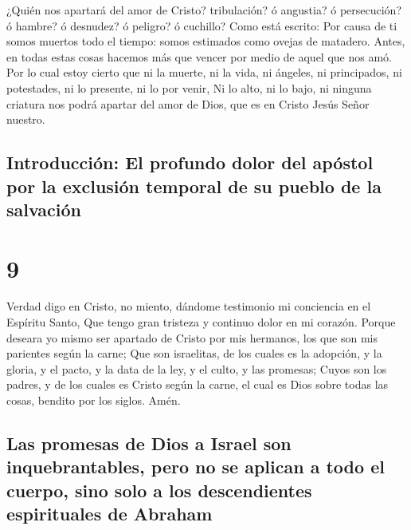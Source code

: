  ¿Quién nos apartará del amor de Cristo? tribulación? ó
angustia? ó persecución? ó hambre? ó desnudez? ó peligro? ó cuchillo?
 Como está escrito: Por causa de ti somos muertos todo el
tiempo: somos estimados como ovejas de matadero.  Antes,
en todas estas cosas hacemos más que vencer por medio de aquel que nos
amó.  Por lo cual estoy cierto que ni la muerte, ni la
vida, ni ángeles, ni principados, ni potestades, ni lo presente, ni lo
por venir,  Ni lo alto, ni lo bajo, ni ninguna criatura
nos podrá apartar del amor de Dios, que es en Cristo Jesús Señor
nuestro.

\hypertarget{introducciuxf3n-el-profundo-dolor-del-apuxf3stol-por-la-exclusiuxf3n-temporal-de-su-pueblo-de-la-salvaciuxf3n}{%
\subsection{Introducción: El profundo dolor del apóstol por la exclusión
temporal de su pueblo de la
salvación}\label{introducciuxf3n-el-profundo-dolor-del-apuxf3stol-por-la-exclusiuxf3n-temporal-de-su-pueblo-de-la-salvaciuxf3n}}

\hypertarget{section-45-9}{%
\section{9}\label{section-45-9}}

 Verdad digo en Cristo, no miento, dándome testimonio mi
conciencia en el Espíritu Santo,  Que tengo gran tristeza
y continuo dolor en mi corazón.  Porque deseara yo mismo
ser apartado de Cristo por mis hermanos, los que son mis parientes según
la carne;  Que son israelitas, de los cuales es la
adopción, y la gloria, y el pacto, y la data de la ley, y el culto, y
las promesas;  Cuyos son los padres, y de los cuales es
Cristo según la carne, el cual es Dios sobre todas las cosas, bendito
por los siglos. Amén.

\hypertarget{las-promesas-de-dios-a-israel-son-inquebrantables-pero-no-se-aplican-a-todo-el-cuerpo-sino-solo-a-los-descendientes-espirituales-de-abraham}{%
\subsection{Las promesas de Dios a Israel son inquebrantables, pero no
se aplican a todo el cuerpo, sino solo a los descendientes espirituales
de
Abraham}\label{las-promesas-de-dios-a-israel-son-inquebrantables-pero-no-se-aplican-a-todo-el-cuerpo-sino-solo-a-los-descendientes-espirituales-de-abraham}}

